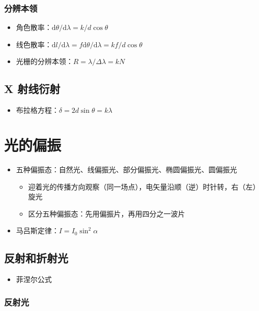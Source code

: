\documentclass{article}
\begin{document}
\subsubsection{分辨本领}

\begin{itemize}
    \item 角色散率：$\mathrm{d}\theta/\mathrm{d}\lambda=k/d\cos\theta$
    \item 线色散率：$\mathrm{d}l/\mathrm{d}\lambda=f\mathrm{d}\theta/\mathrm{d}\lambda=kf/d\cos\theta$
    \item 光栅的分辨本领：$R=\lambda/\Delta\lambda=kN$
\end{itemize}

\subsection{X 射线衍射}

\begin{itemize}
    \item 布拉格方程：$\delta=2d\sin\theta=k\lambda$
\end{itemize}

\section{光的偏振}

\begin{itemize}
    \item 五种偏振态：自然光、线偏振光、部分偏振光、椭圆偏振光、圆偏振光 \begin{itemize}
        \item 迎着光的传播方向观察（同一场点），电矢量沿顺（逆）时针转，右（左）旋光
        \item 区分五种偏振态：先用偏振片，再用四分之一波片
    \end{itemize}
    \item 马吕斯定律：$I=I_0\sin^2\alpha$
\end{itemize}

\subsection{反射和折射光}

\begin{itemize}
    \item 菲涅尔公式
\end{itemize}

\subsubsection{反射光}
\end{document}
